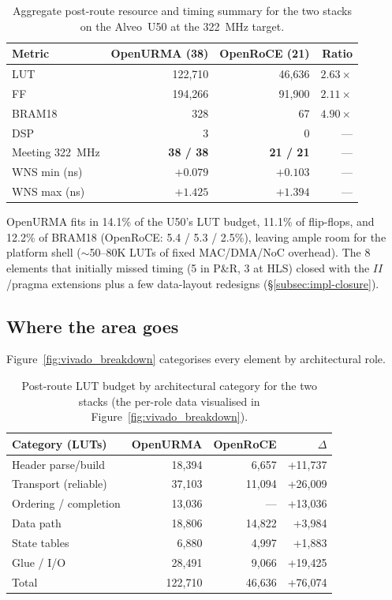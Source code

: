 \documentclass[10pt,twocolumn]{article}
\begin{document}
\begin{table}[h]
  \centering
  \scriptsize
  \setlength{\tabcolsep}{4pt}
  \begin{tabular}{lrrr}
  \toprule
  Metric & OpenURMA (38) & OpenRoCE (21) & Ratio \\
  \midrule
  LUT & 122{,}710 & 46{,}636 & $2.63\times$ \\
  FF & 194{,}266 & 91{,}900 & $2.11\times$ \\
  BRAM18 & 328 & 67 & $4.90\times$ \\
  DSP & 3 & 0 & --- \\
  Meeting 322~MHz & \textbf{38 / 38} & \textbf{21 / 21} & --- \\
  WNS min (ns) & $+0.079$ & $+0.103$ & --- \\
  WNS max (ns) & $+1.425$ & $+1.394$ & --- \\
  \bottomrule
  \end{tabular}
  \caption{Aggregate post-route resource and timing summary for the
    two stacks on the Alveo~U50 at the 322~MHz target.}
  \label{tab:resource-summary}
\end{table}

OpenURMA fits in 14.1\% of the U50's LUT budget, 11.1\% of
flip-flops, and 12.2\% of BRAM18 (OpenRoCE: 5.4 / 5.3 / 2.5\%),
leaving ample room for the platform shell ($\sim$50--80K LUTs of
fixed MAC/DMA/NoC overhead). The 8 elements that initially missed
timing (5 in P\&R, 3 at HLS) closed with the $II$/pragma
extensions plus a few data-layout redesigns
(\S\ref{subsec:impl-closure}).

\subsection{Where the area goes}
Figure~\ref{fig:vivado_breakdown} categorises every element by
architectural role.

\begin{table}[h]
  \centering
  \footnotesize
  \begin{tabular}{lrrr}
  \toprule
  Category (LUTs) & OpenURMA & OpenRoCE & $\Delta$ \\
  \midrule
  Header parse/build         & 18,394 & 6,657   & +11,737 \\
  Transport (reliable)       & 37,103 & 11,094  & +26,009 \\
  Ordering / completion      & 13,036 & ---     & +13,036 \\
  Data path                  & 18,806 & 14,822  & +3,984  \\
  State tables               &  6,880 &  4,997  & +1,883  \\
  Glue / I/O                 & 28,491 &  9,066  & +19,425 \\
  \midrule
  Total                      & 122,710 & 46,636 & +76,074 \\
  \bottomrule
  \end{tabular}
  \caption{Post-route LUT budget by architectural category for the
    two stacks (the per-role data visualised in
    Figure~\ref{fig:vivado_breakdown}).}
  \label{tab:area-category}
\end{table}
\end{document}
